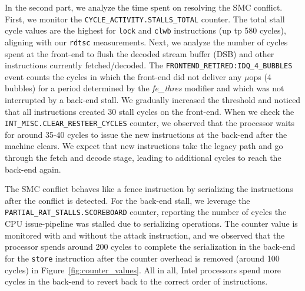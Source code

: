 In the second part, we analyze the time spent on resolving the SMC conflict. First, we monitor the \texttt{CYCLE\_\allowbreak ACTIVITY.\allowbreak STALLS\_\allowbreak TOTAL} counter. The total stall cycle values are the highest for \texttt{lock} and \texttt{clwb} instructions (up tp 580 cycles), aligning with our \texttt{rdtsc} measurements. 
Next, we analyze the number of cycles spent at the front-end to flush the decoded stream buffer (DSB) and other instructions currently fetched/decoded. The \texttt{FRONTEND\_RETIRED:IDQ\_4\_BUBBLES}  event counts the cycles in which the front-end did not deliver any $\mu$ops (4 bubbles) for a period determined by the \textit{fe\_thres} modifier and which was not interrupted by a back-end stall. 
We gradually increased the threshold and noticed that all instructions created 30 stall cycles on the front-end. 
When we check the \texttt{INT\_MISC.CLEAR\_RESTEER\_CYCLES} counter, we observed that the processor waits for around 35-40 cycles to issue the new instructions at the back-end after the machine clears. We expect that new instructions take the legacy path and go through the fetch and decode stage, leading to additional cycles to reach the back-end again. 

The SMC conflict behaves like a fence instruction by serializing the instructions after the conflict is detected. For the back-end stall, we leverage the \texttt{PARTIAL\_RAT\_\allowbreak STALLS.\allowbreak SCOREBOARD} counter, reporting the number of cycles the CPU issue-pipeline was stalled due to serializing operations. The counter value is monitored with and without the attack instruction, and we observed that the processor spends around 200 cycles to complete the serialization in the back-end for the \texttt{store} instruction after the counter overhead is removed (around 100 cycles) in Figure~\ref{fig:counter_values}.
All in all, Intel processors spend more cycles in the back-end to revert back to the correct order of instructions.

